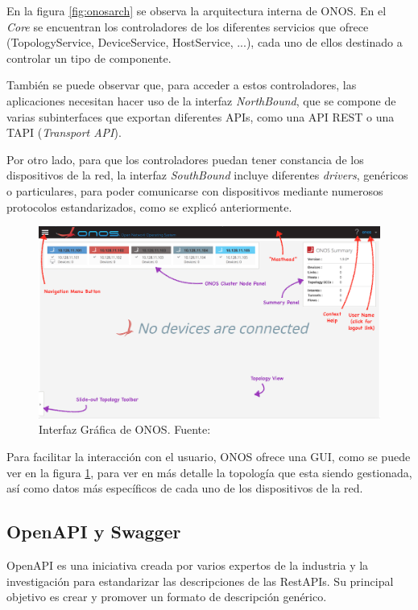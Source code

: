 En la figura \ref{fig:onosarch} se observa la arquitectura interna de ONOS. En el \textit{Core} se encuentran los controladores de los diferentes servicios que ofrece (TopologyService, DeviceService, HostService, ...), cada uno de ellos destinado a controlar un tipo de componente.

También se puede observar que, para acceder a estos controladores, las aplicaciones necesitan hacer uso de la interfaz \textit{NorthBound}, que se compone de varias subinterfaces que exportan diferentes APIs, como una API REST o una TAPI (\textit{Transport API}).

Por otro lado, para que los controladores puedan tener constancia de los dispositivos de la red, la interfaz \textit{SouthBound} incluye diferentes \textit{drivers}, genéricos o particulares, para poder comunicarse con dispositivos mediante numerosos protocolos estandarizados, como se explicó anteriormente.

\begin{figure}[!ht]
	\centering
	\includegraphics[width=0.8\linewidth]{imagenes/onos_gui}
	\caption{Interfaz Gráfica de ONOS. 
		Fuente: \cite{wikionosbib}}
	\label{fig:onosgui}
\end{figure}

Para facilitar la interacción con el usuario, ONOS ofrece una GUI, como se puede ver en la figura \ref{fig:onosgui}, para ver en más detalle la topología que esta siendo gestionada, así como datos más específicos de cada uno de los dispositivos de la red. 


\subsection{OpenAPI y Swagger}
\label{subsec:openapi}

OpenAPI\cite{openapibib} es una iniciativa creada por varios expertos de la industria y la investigación para estandarizar las descripciones de las RestAPIs. Su principal objetivo es crear y promover un formato de descripción genérico.

